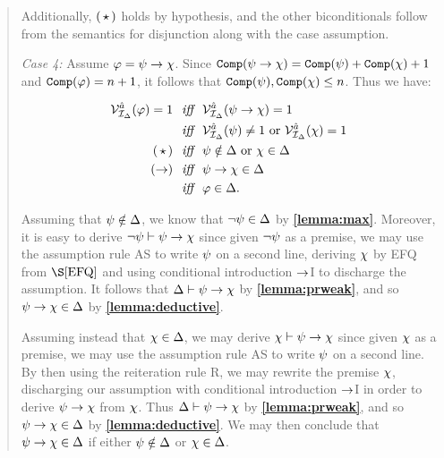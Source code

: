 \begin{quote}
  Additionally, $(\hspace{1.6pt}\star\hspace{1.6pt})$ holds by hypothesis, and the other biconditionals follow from the semantics for disjunction along with the case assumption.

  \textit{Case 4:}
  Assume $\varphi=\psi\rightarrow\chi$.
  Since $\texttt{Comp}(\psi\rightarrow\chi)=\texttt{Comp}(\psi)+\texttt{Comp}(\chi)+1$ and  $\texttt{Comp}(\varphi)=n+1$, it follows that $\texttt{Comp}(\psi),\texttt{Comp}(\chi)\leq n$.
  Thus we have:

  \vspace{-.2in}
  \begin{align*}
    \mathcal{V}_{\mathcal{I}_{\Delta}}^{\hat{a}}(\varphi)=1 &\textit{ ~iff~ } \mathcal{V}_{\mathcal{I}_{\Delta}}^{\hat{a}}(\psi\rightarrow\chi)=1\\
      &\textit{ ~iff~ } \mathcal{V}_{\mathcal{I}_{\Delta}}^{\hat{a}}(\psi)\neq 1 \text{ or } \mathcal{V}_{\mathcal{I}_{\Delta}}^{\hat{a}}(\chi)=1 \\
      (\hspace{1.6pt}\star\hspace{1.6pt}) &\textit{ ~iff~ } \psi\notin\Delta \text{ or } \chi\in\Delta \\
      (\rightarrow) &\textit{ ~iff~ } \psi\rightarrow\chi\in\Delta \\
      &\textit{ ~iff~ } \varphi\in\Delta.
  \end{align*}

  Assuming that $\psi\notin\Delta$, we know that $\neg\psi\in\Delta$ by \textbf{\ref{lemma:max}}.
  Moreover, it is easy to derive $\neg\psi\vdash\psi\rightarrow\chi$ since given $\neg\psi$ as a premise, we may use the assumption rule AS to write $\psi$ on a second line, deriving $\chi$ by EFQ from $\S\ref{EFQ}$ and using conditional introduction $\rightarrow$I to discharge the assumption.
  It follows that $\Delta\vdash\psi\rightarrow\chi$ by \textbf{\ref{lemma:prweak}}, and so $\psi\rightarrow\chi\in\Delta$ by \textbf{\ref{lemma:deductive}}.

  Assuming instead that $\chi\in\Delta$, we may derive $\chi\vdash\psi\rightarrow\chi$ since given $\chi$ as a premise, we may use the assumption rule AS to write $\psi$ on a second line.
  By then using the reiteration rule R, we may rewrite the premise $\chi$, discharging our assumption with conditional introduction $\rightarrow$I in order to derive $\psi\rightarrow\chi$ from $\chi$. 
  Thus $\Delta\vdash\psi\rightarrow\chi$ by \textbf{\ref{lemma:prweak}}, and so $\psi\rightarrow\chi\in\Delta$ by \textbf{\ref{lemma:deductive}}.
  We may then conclude that $\psi\rightarrow\chi\in\Delta$ if either $\psi\notin\Delta$ or $\chi\in\Delta$.


\end{quote}
